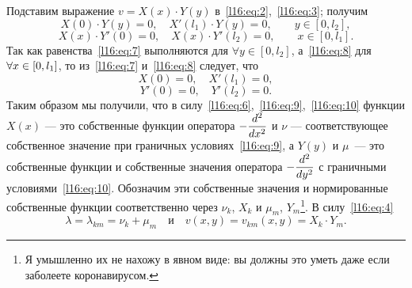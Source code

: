 Подставим выражение $v=X(x)\cdot Y(y)$ в~\eqref{l16:eq:2},~\eqref{l16:eq:3}; получим
\begin{equation}\label{l16:eq:7}
	 X(0)\cdot Y(y)=0,\quad X'(l_1)\cdot Y(y)=0,\qquad y\in[0,l_2],
\end{equation}
\begin{equation}\label{l16:eq:8}
	 X(x)\cdot Y'(0)=0,\quad X(x)\cdot Y'(l_2)=0,\qquad x\in[0,l_1].
\end{equation}
Так как равенства~\eqref{l16:eq:7} выполняются для $\forall y\in[0,l_2]$, а~\eqref{l16:eq:8} для $\forall x\?\in[0,l_1]$, то из~\eqref{l16:eq:7} и~\eqref{l16:eq:8} следует, что
\begin{equation}\label{l16:eq:9}
	 X(0)=0,\quad X'(l_1)=0,
\end{equation}
\begin{equation}\label{l16:eq:10}
	 Y'(0)=0,\quad Y'(l_2)=0.
\end{equation}
Таким образом мы получили, что в силу~\eqref{l16:eq:6},~\eqref{l16:eq:9},~\eqref{l16:eq:10} функции $X(x)$ --- это собственные функции оператора $-\displaystyle\frac{d^2}{dx^2}$ и $\nu$ --- соответствующее собственное значение при граничных условиях~\eqref{l16:eq:9}, а $Y(y)$ и $\mu$~--- это собственные функции и собственные значения оператора $-\displaystyle\frac{d^2}{dy^2}$ с граничными условиями~\eqref{l16:eq:10}. Обозначим эти собственные значения и нормированные собственные функции соответственно через $\nu_k$, $X_k$ и $\mu_m$, $Y_m$\footnote{Я умышленно их не нахожу в явном виде: вы должны это уметь даже если заболеете коронавирусом.}. В силу~\eqref{l16:eq:4}
\begin{equation*}
	\lambda=\lambda_{km}=\nu_k+\mu_m\quad\text{и}\quad v(x,y)=v_{km}(x,y)=X_k\cdot Y_m.
\end{equation*}

